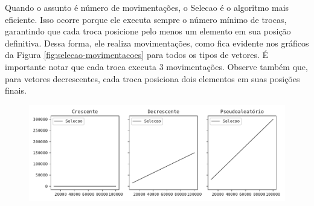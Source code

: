 Quando o assunto é número de movimentações, o Selecao é o algoritmo mais eficiente. Isso ocorre porque ele executa sempre o número mínimo de trocas, garantindo que cada troca posicione pelo menos um elemento em sua posição definitiva. Dessa forma, ele realiza  movimentações, como fica evidente nos gráficos da Figura \ref{fig:selecao-movimentacoes} para todos os tipos de vetores. É importante notar que cada troca executa $3$ movimentações. Observe também que, para vetores decrescentes, cada troca posiciona dois elementos em suas posições finais.

\begin{figure}[H]
\centering
\includegraphics[scale=0.787]{figuras/pdf/selecao.movimentacoes.pdf}
\end{figure}
